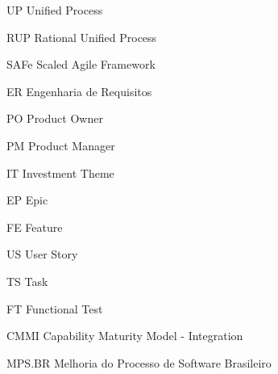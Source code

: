 \begin{siglas}
  \item[UP] Unified Process
  \item[RUP] Rational Unified Process
  \item[SAFe] Scaled Agile Framework
  \item[ER] Engenharia de Requisitos
  \item[PO] Product Owner
  \item[PM] Product Manager
  \item[IT] Investment Theme
  \item[EP] Epic
  \item[FE] Feature
  \item[US] User Story
  \item[TS] Task
  \item[FT] Functional Test
  \item[CMMI] Capability Maturity Model - Integration
  \item[MPS.BR] Melhoria do Processo de Software Brasileiro
\end{siglas}
